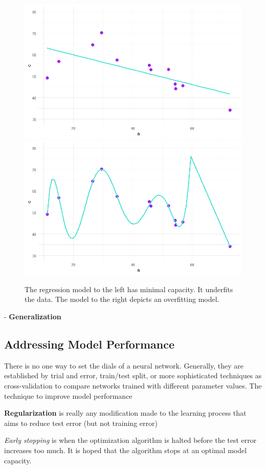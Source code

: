 
\begin{figure}[H]
    \includegraphics[width=0.5\linewidth]{Figures/underfit.png}
    \includegraphics[width=0.5\linewidth]{Figures/overfit.png}
    \vspace{-20pt}
    \caption{\footnotesize{The regression model to the left has minimal capacity.  It underfits the data. The model to the right depicts an overfitting model.}}
    \label{capacityviz}
\end{figure}


- \textbf{Generalization}


\subsection{Addressing Model Performance}

There is no one way to set the dials of a neural network.  Generally, they are established by trial and error, train/test split, or more sophisticated techniques as cross-validation to compare networks trained with different parameter values. \cite{mackay1992practical}  The technique to improve model performance



\textbf{Regularization} is really any modification made to the learning process that aims to reduce test error (but not training error) \cite{Goodfellow-et-al-2016}


\textit{Early stopping} is when the optimization algorithm is halted before the test error increases too much.  It is hoped that the algorithm stops at an optimal model capacity.


